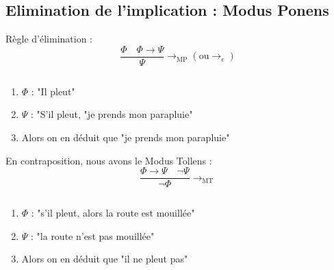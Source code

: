\subsection{Elimination de l'implication : Modus Ponens}
Règle d'élimination :
\begin{equation*}
\frac{\Phi\quad\Phi\rightarrow\Psi}{\Psi}\rightarrow_\text{MP} (\text{ou} \rightarrow_e)
\end{equation*}
\begin{example} 
$\;$
\begin{enumerate}
    \item $\Phi$ : "Il pleut"
    \item $\Psi$ : "S'il pleut, "je prends mon parapluie"
    \item Alors on en déduit que "je prends mon parapluie"
\end{enumerate}
\end{example}

En contraposition, nous avons le Modus Tollens :
\begin{equation*}
\frac{\Phi\rightarrow\Psi\quad\neg\Psi}{\neg\Phi}\rightarrow_\text{MT}
\end{equation*}
\begin{example}
$\;$
\begin{enumerate}
    \item $\Phi$ : "s'il pleut, alors la route est mouillée"
    \item $\Psi$ : "la route n'est pas mouillée"
    \item Alors on en déduit que "il ne pleut pas"
\end{enumerate}
\end{example}

